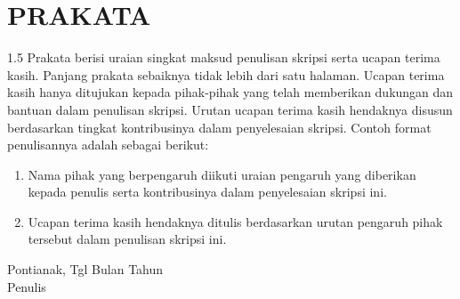 \chapter*{PRAKATA}
\begin{spacing}{1.5}
Prakata berisi uraian singkat maksud penulisan skripsi serta ucapan terima kasih. Panjang prakata sebaiknya tidak lebih dari satu halaman. Ucapan terima kasih hanya ditujukan kepada pihak-pihak yang telah memberikan dukungan dan bantuan dalam penulisan skripsi. Urutan ucapan terima kasih hendaknya disusun berdasarkan tingkat kontribusinya dalam penyelesaian skripsi. Contoh format penulisannya adalah sebagai berikut:

\begin{enumerate}
    \item Nama pihak yang berpengaruh diikuti uraian pengaruh yang diberikan kepada penulis serta kontribusinya dalam penyelesaian skripsi ini.
    \item Ucapan terima kasih hendaknya ditulis berdasarkan urutan pengaruh pihak tersebut dalam penulisan skripsi ini.
\end{enumerate}
\end{spacing}

\vspace{1cm}
\begin{flushright}
\begin{minipage}{5cm}
\begin{singlespace}
Pontianak, Tgl Bulan Tahun \\[1.5cm]
Penulis
\end{singlespace}
\end{minipage}
\end{flushright}
